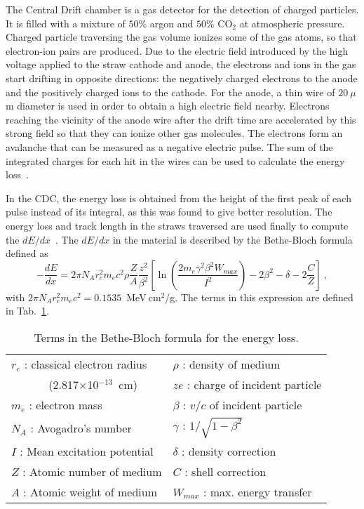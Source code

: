 The Central Drift chamber is a gas detector for the detection of charged particles. It is filled with a mixture of $50\%$ argon and $50\%$ CO$_{2}$ at atmospheric pressure. Charged particle traversing the gas volume ionizes some of the gas atoms, so that electron-ion pairs are produced. Due to the electric field introduced by the high voltage applied to the straw cathode and anode, the electrons and ions in the gas start drifting in opposite directions: the negatively charged electrons to the anode and the positively charged ions to the cathode. For the anode, a thin wire of $20~\mu$m diameter is used in order to obtain a high electric field nearby. Electrons reaching the vicinity of the anode wire after the drift time are accelerated by this strong field so that they can ionize other gas molecules. The electrons form an avalanche that can be measured as a negative electric pulse. The sum of the integrated charges for each hit in the wires can be used to calculate the energy loss~\cite{Haarlem10}.
~\par In the CDC, the energy loss is obtained from the height of the first peak of each pulse instead of its integral, as this was found to give better resolution. The energy loss and track length in the straws traversed are used finally to compute the $dE/dx$~\cite{Jarvis20}.
The $dE/dx$ in the material is described by the Bethe-Bloch formula~\cite{Leo94} defined as
\begin{equation}
    \label{eq.3.1}
    -\frac{dE}{dx} = 2 \pi N_A r_e^2 m_e c^2 \rho \frac{Z}{A} \frac{z^2}{\beta^2} \left [ \ln \left( \frac{2 m_e \gamma^2 \beta^2 W_{max}}{I^2} \right) - 2 \beta^2 - \delta - 2\frac{C}{Z} \right]~,
\end{equation}
with $2 \pi N_A r_e^2 m_e c^2 = 0.1535$~MeV$~\!$cm$^2$/g. The terms in this expression are defined in Tab.~\ref{tab.3.1}.
\begin{table}[b]
    \begin{center}
        \caption{\small{Terms in the Bethe-Bloch formula for the energy loss.}}
        \label{tab.3.1}
        \begin{tabular} {||l||l||} \hline
            $r_e$ : classical electron radius   & $\rho$ : density of medium \\
            ~~~~~~ (2.817$\times$10$^{-13}$~cm) & $ze$ : charge of incident particle \\
            $m_e$ : electron mass               & $\beta$ : $v/c$ of incident particle \\
            $N_A$ : Avogadro's number           & $\gamma$ : $1/\sqrt{1 - \beta^2}$ \\
            $I$  : Mean excitation potential    & $\delta$ : density correction \\
            $Z$ : Atomic number of medium       & $C$ : shell correction \\
            $A$ : Atomic weight of medium       & $W_{max}$ : max. energy transfer \\ \hline
        \end{tabular}
    \end{center}
\end{table}
